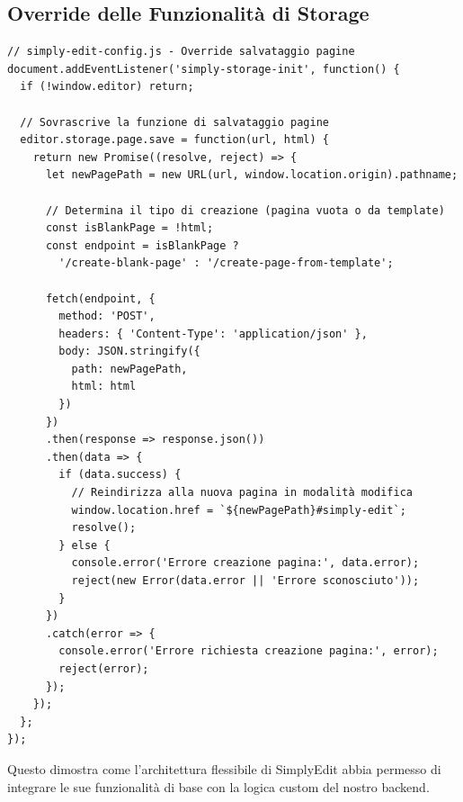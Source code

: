 \subsection{Override delle Funzionalità di Storage}
\begin{verbatim}
// simply-edit-config.js - Override salvataggio pagine
document.addEventListener('simply-storage-init', function() {
  if (!window.editor) return;

  // Sovrascrive la funzione di salvataggio pagine
  editor.storage.page.save = function(url, html) {
    return new Promise((resolve, reject) => {
      let newPagePath = new URL(url, window.location.origin).pathname;
      
      // Determina il tipo di creazione (pagina vuota o da template)
      const isBlankPage = !html;
      const endpoint = isBlankPage ? 
        '/create-blank-page' : '/create-page-from-template';
      
      fetch(endpoint, {
        method: 'POST',
        headers: { 'Content-Type': 'application/json' },
        body: JSON.stringify({ 
          path: newPagePath, 
          html: html 
        })
      })
      .then(response => response.json())
      .then(data => {
        if (data.success) {
          // Reindirizza alla nuova pagina in modalità modifica
          window.location.href = `${newPagePath}#simply-edit`;
          resolve();
        } else {
          console.error('Errore creazione pagina:', data.error);
          reject(new Error(data.error || 'Errore sconosciuto'));
        }
      })
      .catch(error => {
        console.error('Errore richiesta creazione pagina:', error);
        reject(error);
      });
    });
  };
});
\end{verbatim}

Questo dimostra come l'architettura flessibile di SimplyEdit abbia permesso di integrare le sue funzionalità di base con la logica custom del nostro backend.